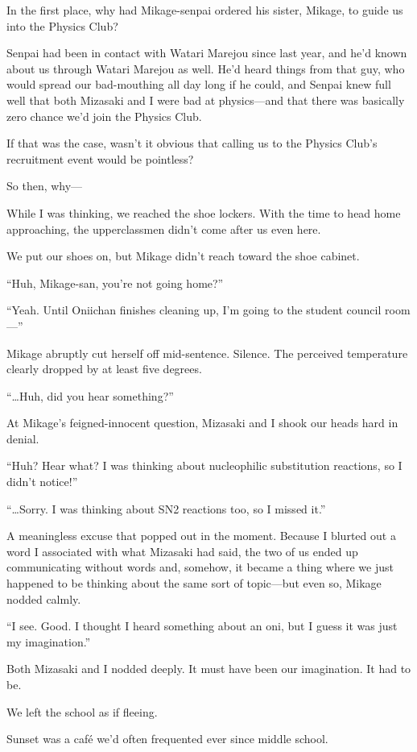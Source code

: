\documentclass[
    a4paper,
    12pt,
    twoside,
    openany,
    UTF8,
    fontset=windows
]{ctexbook}
\begin{document}
In the first place, why had Mikage-senpai ordered his sister, Mikage, to guide us into the Physics Club?

Senpai had been in contact with Watari Marejou since last year, and he'd known about us through Watari Marejou as well. He'd heard things from that guy, who would spread our bad-mouthing all day long if he could, and Senpai knew full well that both Mizasaki and I were bad at physics---and that there was basically zero chance we'd join the Physics Club.

If that was the case, wasn't it obvious that calling us to the Physics Club's recruitment event would be pointless?

So then, why---

While I was thinking, we reached the shoe lockers. With the time to head home approaching, the upperclassmen didn't come after us even here.

We put our shoes on, but Mikage didn't reach toward the shoe cabinet.

``Huh, Mikage-san, you're not going home?''

``Yeah. Until Oniichan finishes cleaning up, I'm going to the student council room---''

Mikage abruptly cut herself off mid-sentence. Silence. The perceived temperature clearly dropped by at least five degrees.

``\dots Huh, did you hear something?''

At Mikage's feigned-innocent question, Mizasaki and I shook our heads hard in denial.

``Huh? Hear what? I was thinking about nucleophilic substitution reactions, so I didn't notice!''

``\dots Sorry. I was thinking about SN2 reactions too, so I missed it.''

A meaningless excuse that popped out in the moment. Because I blurted out a word I associated with what Mizasaki had said, the two of us ended up communicating without words and, somehow, it became a thing where we just happened to be thinking about the same sort of topic---but even so, Mikage nodded calmly.

``I see. Good. I thought I heard something about an oni, but I guess it was just my imagination.''

Both Mizasaki and I nodded deeply. It must have been our imagination. It had to be.

We left the school as if fleeing.

Sunset was a café we'd often frequented ever since middle school.
\end{document}

